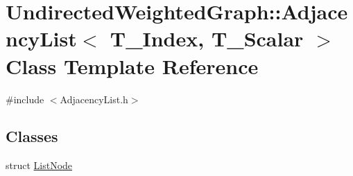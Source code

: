 \hypertarget{class_undirected_weighted_graph_1_1_adjacency_list}{\section{Undirected\+Weighted\+Graph\+:\+:Adjacency\+List$<$ T\+\_\+\+Index, T\+\_\+\+Scalar $>$ Class Template Reference}
\label{class_undirected_weighted_graph_1_1_adjacency_list}
}


{\ttfamily \#include $<$Adjacency\+List.\+h$>$}

\subsection*{Classes}
\begin{DoxyCompactItemize}
\item 
struct \hyperlink{struct_undirected_weighted_graph_1_1_adjacency_list_1_1_list_node}{List\+Node}
\end{DoxyCompactItemize}
